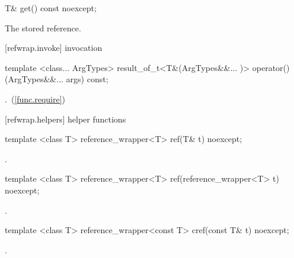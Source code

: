 %
\begin{itemdecl}
T& get() const noexcept;
\end{itemdecl}

\begin{itemdescr}
\pnum\returns The stored reference.
\end{itemdescr}


[refwrap.invoke]{ invocation}

%
\begin{itemdecl}
template <class... ArgTypes>
  result_of_t<T&(ArgTypes&&... )>
    operator()(ArgTypes&&... args) const;
\end{itemdecl}

\begin{itemdescr}
\pnum\returns {}.~(\ref{func.require})
\end{itemdescr}


[refwrap.helpers]{ helper functions}

%
\begin{itemdecl}
template <class T> reference_wrapper<T> ref(T& t) noexcept;
\end{itemdecl}

\begin{itemdescr}
\pnum\returns {}.
\end{itemdescr}

%
\begin{itemdecl}
template <class T> reference_wrapper<T> ref(reference_wrapper<T> t) noexcept;
\end{itemdecl}

\begin{itemdescr}
\pnum\returns {}.
\end{itemdescr}

%
\begin{itemdecl}
template <class T> reference_wrapper<const T> cref(const T& t) noexcept;
\end{itemdecl}

\begin{itemdescr}
\pnum\returns {}.
\end{itemdescr}

